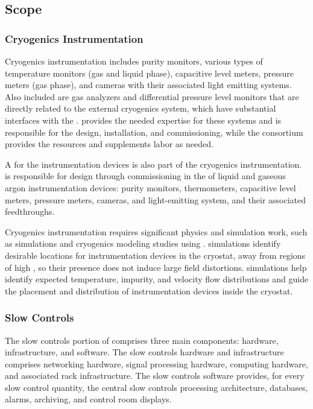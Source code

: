 \subsection{Scope}
\subsubsection{Cryogenics Instrumentation}
Cryogenics instrumentation includes purity monitors, various types of temperature monitors (gas and liquid phase), capacitive level meters, pressure meters (gas phase), and cameras with their associated light emitting systems. Also included are %
gas analyzers and differential pressure level monitors that are directly related to the external cryogenics system, which have substantial interfaces with the .  provides the needed expertise for these systems and is responsible for the design, installation, and commissioning, while the  consortium provides the resources and supplements labor as needed. 

A  for the instrumentation devices is also part of the cryogenics instrumentation.
  is responsible for design through commissioning in the  %
of liquid and gaseous argon instrumentation devices: purity monitors, thermometers, capacitive level meters, pressure meters, cameras, and light-emitting system, and their associated feedthroughs.

Cryogenics instrumentation %
requires significant physics and
simulation work, such as \efield simulations and cryogenics modeling
studies using . \efield simulations
identify desirable locations for instrumentation
devices in the cryostat, away from %
regions of high \efield, so %
their presence does not induce large field distortions. 
 simulations help identify %
expected temperature, impurity, and velocity flow distributions and guide the placement and distribution of instrumentation devices inside the cryostat.

\subsubsection{Slow Controls}
\label{sec:dp-cisc-slowctrl}
The slow controls portion of  comprises three main components: 
hardware, infrastructure, and software. The slow controls hardware and infrastructure comprises networking hardware, signal processing hardware, computing hardware, and associated rack infrastructure. The slow controls software provides, for every slow control quantity, the central slow controls processing architecture, databases, alarms, archiving, and control room displays.


